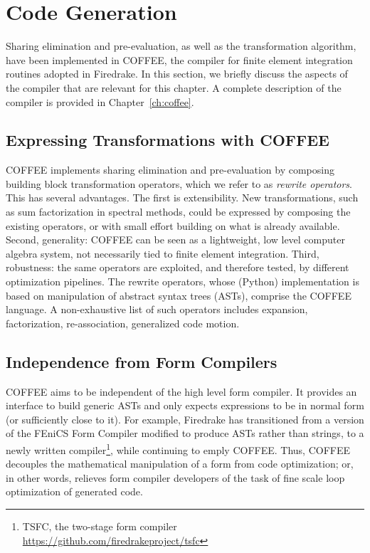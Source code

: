 \section{Code Generation}
\label{sec:codegen}
Sharing elimination and pre-evaluation, as well as the transformation algorithm, have been implemented in COFFEE, the compiler for finite element integration routines adopted in Firedrake. In this section, we briefly discuss the aspects of the compiler that are relevant for this chapter. A complete description of the compiler is provided in Chapter~\ref{ch:coffee}.

\subsection{Expressing Transformations with COFFEE}
COFFEE implements sharing elimination and pre-evaluation by composing building block transformation operators, which we refer to as \emph{rewrite operators}. This has several advantages. The first is extensibility. New transformations, such as sum factorization in spectral methods, could be expressed by composing the existing operators, or with small effort building on what is already available. Second, generality: COFFEE can be seen as a lightweight, low level computer algebra system, not necessarily tied to finite element integration. Third, robustness: the same operators are exploited, and therefore tested, by different optimization pipelines. The rewrite operators, whose (Python) implementation is based on manipulation of abstract syntax trees (ASTs), comprise the COFFEE language. A non-exhaustive list of such operators includes expansion, factorization, re-association, generalized code motion.

\subsection{Independence from Form Compilers}
COFFEE aims to be independent of the high level form compiler. It provides an interface to build generic ASTs and only expects expressions to be in normal form (or sufficiently close to it). For example, Firedrake has transitioned from a version of the FEniCS Form Compiler \cite{FFC-TC} modified to produce ASTs rather than strings, to a newly written compiler\footnote{TSFC, the two-stage form compiler \url{https://github.com/firedrakeproject/tsfc}}, while continuing to emply COFFEE. Thus, COFFEE decouples the mathematical manipulation of a form from code optimization; or, in other words, relieves form compiler developers of the task of fine scale loop optimization of generated code.

